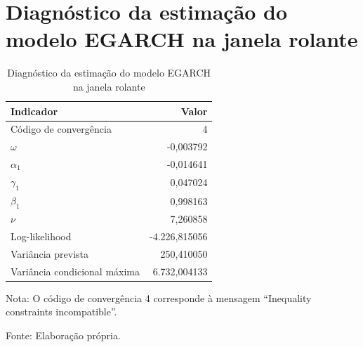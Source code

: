 \section{Diagnóstico da estimação do modelo EGARCH na janela rolante}

\begin{table}[H]
    \centering
    \caption{Diagnóstico da estimação do modelo EGARCH na janela rolante}
    \label{tab:diagnostico_egarch_rolante}
    \small
    \begin{tabular}{lr}
        \toprule
        Indicador & Valor \\
        \midrule
        Código de convergência & 4 \\
        $\omega$ & -0,003792 \\
        $\alpha_1$ & -0,014641 \\
        $\gamma_1$ & 0,047024 \\
        $\beta_1$ & 0,998163 \\
        $\nu$ & 7,260858 \\
        Log-likelihood & -4.226,815056 \\
        Variância prevista & 250,410050 \\
        Variância condicional máxima & 6.732,004133 \\
        \bottomrule
    \end{tabular}
    \begin{center}
        \footnotesize Nota: O código de convergência 4 corresponde à mensagem
        ``Inequality constraints incompatible''.

        \footnotesize Fonte: Elaboração própria.
    \end{center}
\end{table}

